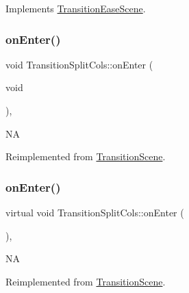 Implements \hyperlink{classTransitionEaseScene_a6f27540600b0d703ed30adc8976e65df}{Transition\+Ease\+Scene}.

\mbox{\label{classTransitionSplitCols_ad172cf3e4da16ebf82ca1efbaaaacdc1}} 
\subsubsection{\texorpdfstring{on\+Enter()}{onEnter()}\hspace{0.1cm}{\footnotesize\ttfamily [1/2]}}
{\footnotesize\ttfamily void Transition\+Split\+Cols\+::on\+Enter (\begin{DoxyParamCaption}\item[{void}]{ }\end{DoxyParamCaption})\hspace{0.3cm}{\ttfamily [override]}, {\ttfamily [virtual]}}

NA 

Reimplemented from \hyperlink{classTransitionScene_aace390a1bd8f3c73bb650a1e256a0f83}{Transition\+Scene}.

\mbox{\label{classTransitionSplitCols_abcf9feef35de88cbc529d3a134f7f098}} 
\subsubsection{\texorpdfstring{on\+Enter()}{onEnter()}\hspace{0.1cm}{\footnotesize\ttfamily [2/2]}}
{\footnotesize\ttfamily virtual void Transition\+Split\+Cols\+::on\+Enter (\begin{DoxyParamCaption}{ }\end{DoxyParamCaption})\hspace{0.3cm}{\ttfamily [override]}, {\ttfamily [virtual]}}

NA 

Reimplemented from \hyperlink{classTransitionScene_aace390a1bd8f3c73bb650a1e256a0f83}{Transition\+Scene}.

\mbox{\label{classTransitionSplitCols_af083146c10d56bb5342ae286c2967e67}} 
